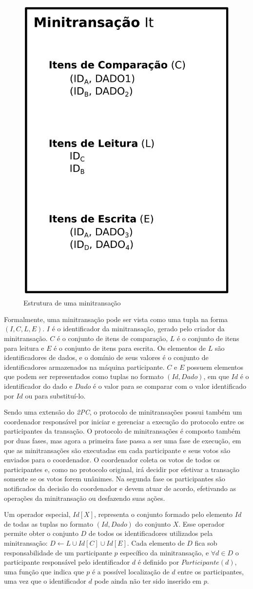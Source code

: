\documentclass[11pt,twoside,a4paper]{book}
\begin{document}
\begin{figure}
  \centering
  \includegraphics[width=.40\textwidth]{estrutura_minitransacao} 
  \caption{Estrutura de uma minitransação}
  \label{fig:estrutura_minitransacao} 
\end{figure}

Formalmente, uma minitransação pode ser vista como uma tupla na forma $(I, C, L, E)$. $I$ é o identificador da minitransação, gerado pelo criador da minitransação. \(C\) é o conjunto de itens de comparação, \(L\) é o conjunto de itens para leitura e \(E\) é o conjunto de itens para escrita. Os elementos de \(L\) são identificadores de dados, e o domínio de seus valores é o conjunto de identificadores armazenados na máquina participante. \(C\) e \(E\) possuem elementos que podem ser representados como tuplas no formato \((Id, Dado)\), em que \(Id\) é o identificador do dado e \(Dado\) é o valor para se comparar com o valor identificado por $Id$ ou para substituí-lo.

Sendo uma extensão do \emph{2PC}, o protocolo de minitransações possui também um
coordenador responsável por iniciar e gerenciar a execução do protocolo entre os
participantes da transação. O protocolo de minitransações é composto também por
duas fases, mas agora a primeira fase passa a ser uma fase de execução, em que
as minitransações são executadas em cada participante e seus votos são enviados para o coordenador. O coordenador coleta os votos de todos os participantes e, como no protocolo original, irá decidir por efetivar a transação somente se os votos forem unânimes. Na segunda fase os participantes são notificados da decisão do coordenador e devem atuar de acordo, efetivando as operações da minitransação ou desfazendo suas ações.

Um operador especial, $Id[X]$, representa o conjunto formado pelo elemento $Id$ de todas as tuplas no formato $(Id, Dado)$ do conjunto $X$. Esse operador permite obter o conjunto $D$ de todos os identificadores utilizados pela minitransação: $D \gets L \cup Id[C] \cup Id[E]$. Cada elemento de $D$ fica sob responsabilidade de um participante $p$ específico da minitransação, e $\forall d \in D$ o participante responsável pelo identificador $d$ é definido por $Participante(d)$, uma função que indica que $p$ é a possível localização de $d$ entre os participantes, uma vez que o identificador $d$ pode ainda não ter sido inserido em $p$.
\end{document}
